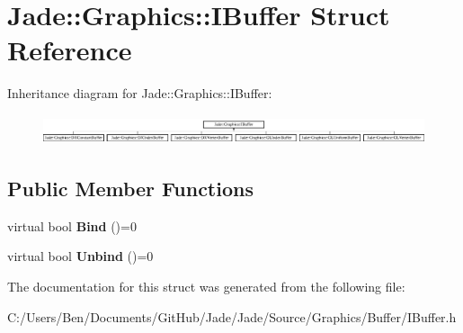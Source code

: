 \hypertarget{struct_jade_1_1_graphics_1_1_i_buffer}{}\section{Jade\+:\+:Graphics\+:\+:I\+Buffer Struct Reference}
\label{struct_jade_1_1_graphics_1_1_i_buffer}
Inheritance diagram for Jade\+:\+:Graphics\+:\+:I\+Buffer\+:\begin{figure}[H]
\begin{center}
\leavevmode
\includegraphics[height=0.876369cm]{struct_jade_1_1_graphics_1_1_i_buffer}
\end{center}
\end{figure}
\subsection*{Public Member Functions}
\begin{DoxyCompactItemize}
\item 
\hypertarget{struct_jade_1_1_graphics_1_1_i_buffer_a5d9f193a1c53aac0006328847b175a7b}{}virtual bool {\bfseries Bind} ()=0\label{struct_jade_1_1_graphics_1_1_i_buffer_a5d9f193a1c53aac0006328847b175a7b}

\item 
\hypertarget{struct_jade_1_1_graphics_1_1_i_buffer_a5d46c1d4c8afcd2e2570c87424643500}{}virtual bool {\bfseries Unbind} ()=0\label{struct_jade_1_1_graphics_1_1_i_buffer_a5d46c1d4c8afcd2e2570c87424643500}

\end{DoxyCompactItemize}


The documentation for this struct was generated from the following file\+:\begin{DoxyCompactItemize}
\item 
C\+:/\+Users/\+Ben/\+Documents/\+Git\+Hub/\+Jade/\+Jade/\+Source/\+Graphics/\+Buffer/I\+Buffer.\+h\end{DoxyCompactItemize}
